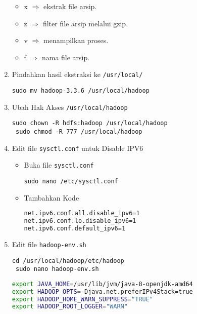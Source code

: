 \documentclass[a4paper]{tufte-handout}
\begin{document}
\begin{enumerate}
\begin{itemize}
\item x $\Rightarrow$ ekstrak file arsip.
\item z $\Rightarrow$ filter file arsip melalui gzip.
\item v $\Rightarrow$ menampilkan proses.
\item f $\Rightarrow$ nama file arsip.
\end{itemize}

\item Pindahkan hasil ekstraksi ke {\tt /usr/local/}
\begin{lstlisting}[language=Terminal]
 sudo mv hadoop-3.3.6 /usr/local/hadoop
\end{lstlisting}

\item Ubah Hak Akses {\tt /usr/local/hadoop}
\begin{lstlisting}[language=Terminal]
 sudo chown -R hdfs:hadoop /usr/local/hadoop
 sudo chmod -R 777 /usr/local/hadoop
\end{lstlisting}

\item Edit file {\tt sysctl.conf} untuk Disable IPV6
\begin{itemize}
\item Buka file {\tt sysctl.conf}
\begin{lstlisting}[language=Terminal]
 sudo nano /etc/sysctl.conf
\end{lstlisting}

\item Tambahkan Kode
\begin{lstlisting}[language=Bash]
net.ipv6.conf.all.disable_ipv6=1
net.ipv6.conf.lo.disable_ipv6=1
net.ipv6.conf.default_ipv6=1
\end{lstlisting}
\end{itemize}

\item Edit file {\tt hadoop-env.sh}
\begin{lstlisting}[language=Terminal]
 cd /usr/local/hadoop/etc/hadoop
 sudo nano hadoop-env.sh
\end{lstlisting}

\begin{lstlisting}[language=Bash]
export JAVA_HOME=/usr/lib/jvm/java-8-openjdk-amd64
export HADOOP_OPTS=-Djava.net.preferIPv4Stack=true
export HADOOP_HOME_WARN_SUPPRESS="TRUE"
export HADOOP_ROOT_LOGGER="WARN"
\end{lstlisting}


\end{enumerate}
\end{document}
